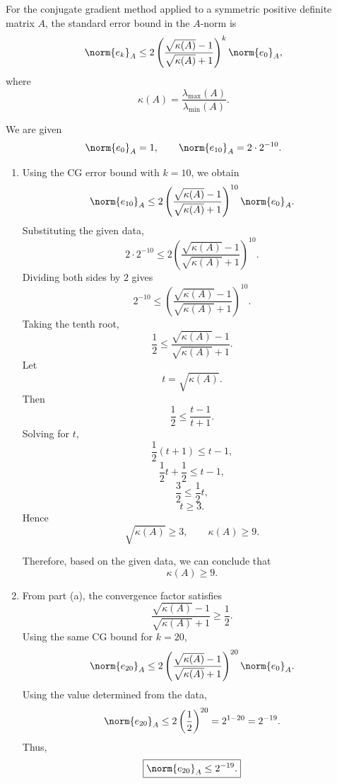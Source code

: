 \documentclass{ctexart}
\begin{document}
  \begin{solution}

    For the conjugate gradient method applied to a symmetric positive definite matrix $A$,
    the standard error bound in the $A$-norm is
    \[
      \norm{e_k}_A
      \le
      2\left(\frac{\sqrt{\kappa(A)}-1}{\sqrt{\kappa(A)}+1}\right)^k
      \norm{e_0}_A,
    \]
    where
    \[
      \kappa(A)=\frac{\lambda_{\max}(A)}{\lambda_{\min}(A)}.
    \]

    We are given
    \[
      \norm{e_0}_A = 1,
      \qquad
      \norm{e_{10}}_A = 2\cdot 2^{-10}.
    \]
    \begin{enumerate}
      \item Using the CG error bound with $k=10$, we obtain
        \[
          \norm{e_{10}}_A
          \le
          2\left(\frac{\sqrt{\kappa(A)}-1}{\sqrt{\kappa(A)}+1}\right)^{10}\norm{e_0}_A.
        \]
        Substituting the given data,
        \[
          2\cdot 2^{-10}
          \le
          2\left(\frac{\sqrt{\kappa(A)}-1}{\sqrt{\kappa(A)}+1}\right)^{10}.
        \]
        Dividing both sides by $2$ gives
        \[
          2^{-10}
          \le
          \left(\frac{\sqrt{\kappa(A)}-1}{\sqrt{\kappa(A)}+1}\right)^{10}.
        \]
        Taking the tenth root,
        \[
          \frac12
          \le
          \frac{\sqrt{\kappa(A)}-1}{\sqrt{\kappa(A)}+1}.
        \]
        Let
        \[
          t=\sqrt{\kappa(A)}.
        \]
        Then
        \[
          \frac12 \le \frac{t-1}{t+1}.
        \]
        Solving for $t$,
        \[
          \frac12(t+1)\le t-1,
        \]
        \[
          \frac12 t+\frac12 \le t-1,
        \]
        \[
          \frac32 \le \frac12 t,
        \]
        \[
          t \ge 3.
        \]
        Hence
        \[
          \sqrt{\kappa(A)} \ge 3,
          \qquad
          \kappa(A)\ge 9.
        \]

        Therefore, based on the given data, we can conclude that
        \[
          \boxed{\kappa(A)\ge 9.}
        \]
      \item From part (a), the convergence factor satisfies
        \[
          \frac{\sqrt{\kappa(A)}-1}{\sqrt{\kappa(A)}+1}\ge \frac12.
        \]
        Using the same CG bound for $k=20$,
        \[
          \norm{e_{20}}_A
          \le
          2\left(\frac{\sqrt{\kappa(A)}-1}{\sqrt{\kappa(A)}+1}\right)^{20}\norm{e_0}_A.
        \]
        Using the value determined from the data,
        \[
          \norm{e_{20}}_A
          \le
          2\left(\frac12\right)^{20}
          =
          2^{1-20}
          =
          2^{-19}.
        \]
        Thus,
        \[
          \boxed{\norm{e_{20}}_A \le 2^{-19}.}
        \]


\end{enumerate}
\end{solution}
\end{document}

